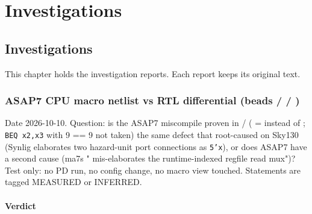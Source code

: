\part{Investigations}\label{cr:part:investigations}

\chapter{Investigations}\label{cr:ch:investigations}

This chapter holds the investigation reports. Each report keeps its original text.

\section{\texorpdfstring{ASAP7 CPU macro netlist vs RTL differential
(beads  /  /
)}{ASAP7 CPU macro netlist vs RTL differential (beads  /  / )}}\label{cr:defect:asap7-cpu-synlig-ma7}

\begin{record}

Date 2026-10-10. Question: is the ASAP7  miscompile
proven in / ( =  instead
of ; \texttt{BEQ\ x2,\allowbreak{}x3} with 9 == 9 not taken)
the same defect that  root-caused on Sky130 (Synlig
elaborates two hazard-unit port connections as \texttt{5'x}), or does
ASAP7 have a second cause (ma7\textquotesingle s "
mis-elaborates the runtime-indexed regfile read mux")? Test only: no PD
run, no config change, no macro view touched. Statements are tagged
MEASURED or INFERRED.

\end{record}

\subsection{Verdict}\label{cr:defect:asap7-cpu-synlig-ma7:verdict}

